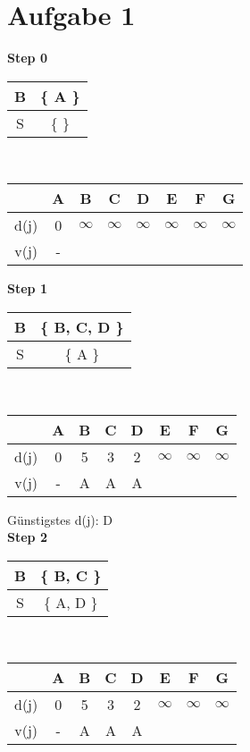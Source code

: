 \documentclass[a4paper,11pt]{article}
\begin{document}
\raggedright %
\setlength{\mathindent}{0cm} %

\section*{Aufgabe 1}

{\setlength{\columnseprule}{.1pt}
\setlength{\columnsep}{3cm}
\begin{multicols}{2}

\textbf{Step 0} \\
\begin{tabular}{ |c|c| } 
  \hline
  B & \{ A \} \\
  \hline
  S & \{  \} \\ 
  \hline
 \end{tabular} \\
\begin{tabular}{ |c|c|c|c|c|c|c|c| } 
  \hline
       & A & B & C & D & E & F & G \\
  \hline
  d(j) & 0 & $\infty$ & $\infty$ & $\infty$ & $\infty$ & $\infty$ & $\infty$ \\
  \hline
  v(j) & - &  &  &  &  &  &  \\
  \hline
\end{tabular}
\vspace{4mm}

\textbf{Step 1} \\
\begin{tabular}{ |c|c| } 
  \hline
  B & \{ B, C, D \} \\
  \hline
  S & \{ A \} \\ 
  \hline
 \end{tabular} \\
\begin{tabular}{ |c|c|c|c|c|c|c|c| } 
  \hline
       & A & B & C & D & E & F & G \\
  \hline
  d(j) & 0 & 5 & 3 & 2 & $\infty$ & $\infty$ & $\infty$ \\
  \hline
  v(j) & - & A & A & A &  &  &  \\
  \hline
\end{tabular}
\vspace{4mm}

Günstigstes d(j): D \\

\textbf{Step 2} \\
\begin{tabular}{ |c|c| } 
  \hline
  B & \{ B, C \} \\
  \hline
  S & \{ A, D \} \\ 
  \hline
 \end{tabular} \\
\begin{tabular}{ |c|c|c|c|c|c|c|c| } 
  \hline
       & A & B & C & D & E & F & G \\
  \hline
  d(j) & 0 & 5 & 3 & 2 & $\infty$ & $\infty$ & $\infty$ \\
  \hline
  v(j) & - & A & A & A &  &  &  \\
  \hline
\end{tabular}
\vspace{4mm}


\end{multicols}}
\end{document}
